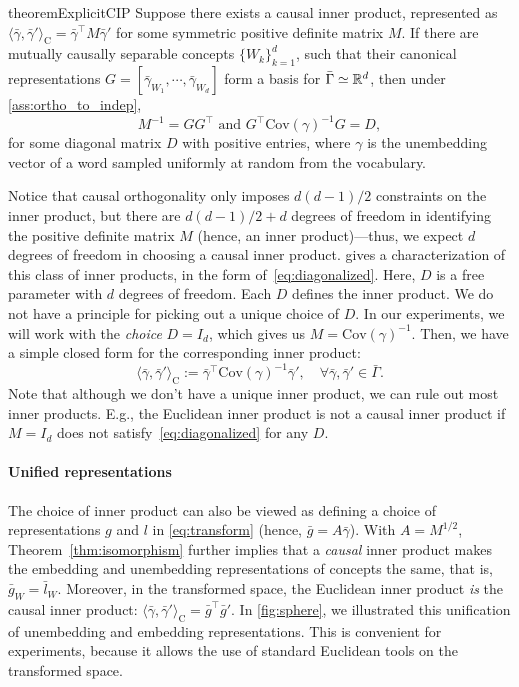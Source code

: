 \documentclass{article}
\theoremstyle{plain}
\theoremstyle{definition}
\theoremstyle{remark}
\newcommand{\cov}{\mathrm{Cov}}
\newcommand{\ip}[2]{\langle #1,#2\rangle}
\begin{document}
\begin{restatable}{theorem}{ExplicitCIP}\label{thm:explicit_form}
    Suppose there exists a causal inner product, represented as $\ip{\bar{\gamma}}{\bar{\gamma}'}_{\mathrm{C}} = \bar{\gamma}^\top M \bar{\gamma}'$ for some symmetric positive definite matrix $M$.
    If there are mutually causally separable concepts $\{W_k\}_{k=1}^d$, such that their canonical representations $G = [\bar{\gamma}_{W_1}, \cdots, \bar{\gamma}_{W_d}]$ form a basis for $\bar\Gamma\simeq \mathbb{R}^d$, then under \cref{ass:ortho_to_indep},
    \begin{equation}\label{eq:diagonalized}
        M^{-1} = G G^{\top} \text{ and } G^\top  \cov(\gamma)^{-1} G = D,
    \end{equation}
    for some diagonal matrix $D$ with positive entries, where $\gamma$ is the unembedding vector of a word sampled uniformly at random from the vocabulary.
\end{restatable}

Notice that causal orthogonality only imposes $d(d-1)/2$ constraints on the inner product, but there are $d(d-1)/2 + d$ degrees of freedom in identifying the positive definite matrix $M$ (hence, an inner product)---thus, we expect $d$ degrees of freedom in choosing a causal inner product. 
 gives a characterization of this class of inner products, in the form of~\eqref{eq:diagonalized}. Here, $D$ is a free parameter with $d$ degrees of freedom. Each $D$ defines the inner product. We do not have a principle for picking out a unique choice of $D$.
In our experiments, we will work with the \emph{choice} $D = I_{d}$, which gives us $M = \cov(\gamma)^{-1}$.
Then, we have a simple closed form for the corresponding inner product: 
\begin{equation}\label{eq:our_CIP}
    \ip{\bar\gamma}{\bar\gamma'}_{\mathrm{C}} := \bar\gamma^\top \cov(\gamma)^{-1} \bar\gamma', \quad \forall \bar\gamma, \bar\gamma' \in \bar\Gamma.
\end{equation}
Note that although we don't have a unique inner product, we can rule out most inner products. E.g., the Euclidean inner product is not a causal inner product if $M=I_{d}$ does not satisfy~\eqref{eq:diagonalized} for any $D$.

\paragraph*{Unified representations}
The choice of inner product can also be viewed as defining a choice of representations $g$ and $l$ in \cref{eq:transform} (hence, $\bar{g} = A\bar{\gamma}$).
With $A = M^{1/2}$, Theorem~\ref{thm:isomorphism} further implies that a \emph{causal} inner product makes the embedding and unembedding representations of concepts the same, that is, $\bar{g}_W = \bar{l}_W$. 
Moreover, in the transformed space, the Euclidean inner product \emph{is} the causal inner product: $\ip{\bar\gamma}{\bar\gamma'}_{\mathrm{C}} = \bar{g}^\top \bar{g}'$.
In \cref{fig:sphere}, we illustrated this unification of unembedding and embedding representations.
This is convenient for experiments, because it allows the use of standard Euclidean tools on the transformed space.
\end{document}
